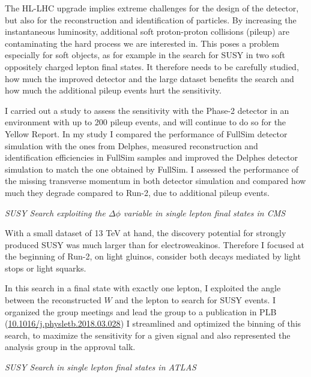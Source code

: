 \documentclass[]{cv} %
\begin{document}
\begin{resume}
The HL-LHC upgrade implies extreme challenges for the design of the detector,
but also for the reconstruction and identification of particles. By increasing
the instantaneous luminosity, additional soft proton-proton collisions (pileup)
are contaminating the hard process we are interested in. This poses a problem
especially for soft objects, as for example in the search for SUSY in two soft
oppositely charged lepton final states. It therefore needs to be carefully
studied, how much the improved detector and the large dataset benefits the
search and how much the additional pileup events hurt the sensitivity.

I carried out a study to assess the sensitivity with the Phase-2 detector in an
environment with up to 200 pileup events, and will continue to do so for the
Yellow Report. In my study I compared the performance of FullSim detector
simulation with the ones from Delphes, measured reconstruction and
identification efficiencies in FullSim samples and improved the Delphes detector
simulation to match the one obtained by FullSim. I assessed the performance of
the missing transverse momentum in both detector simulation and compared how
much they degrade compared to Run-2, due to additional pileup events.

\vspace{15pt}
\Large{}
\textit{SUSY Search exploiting the $\Delta \phi$ variable in single lepton final states in CMS} \\
\normalsize{}

With a small dataset of 13 TeV at hand, the discovery potential for strongly
produced SUSY was much larger than for electroweakinos. Therefore I focused at
the beginning of Run-2, on light gluinos, consider both decays mediated by light
stops or light squarks.

In this search in a final state with exactly one lepton, I exploited the angle
between the reconstructed $W$ and the lepton to search for SUSY events. I
organized the group meetings and lead the group to a publication in PLB
(\href{http://dx.doi.org/10.1016/j.physletb.2018.03.028}{10.1016/j.physletb.2018.03.028})
I streamlined and optimized the binning of this search, to maximize the
sensitivity for a given signal and also represented the analysis group in the
approval talk.

\vspace{15pt}
\Large{}
\textit{SUSY Search in single lepton final states in ATLAS} \\
\normalsize{}


\end{resume}
\end{document}
